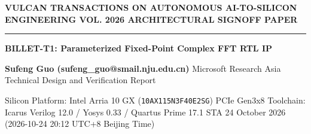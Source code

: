 \documentclass[11pt,a4paper]{article}
\begin{document}
{\scriptsize\sffamily\textcolor{vulcan}{\textbf{VULCAN TRANSACTIONS ON AUTONOMOUS AI-TO-SILICON ENGINEERING \hfill VOL. 2026 \textperiodcentered{} ARCHITECTURAL SIGNOFF PAPER}}\par}

\vspace{1pt}\textcolor{vulcan}{\rule{\textwidth}{1.2pt}}\vspace{4pt}

\begin{center}

{\sffamily\LARGE\bfseries BILLET-T1: Parameterized Fixed-Point Complex FFT RTL IP\par}\vspace{3pt}

{\small\sffamily\textbf{Sufeng Guo (\allowbreak{}sufeng\_\allowbreak{}guo@smail.nju.edu.cn)\allowbreak{}} \textperiodcentered{} Microsoft Research Asia \textperiodcentered{} Technical Design and Verification Report\par}\vspace{1pt}

{\scriptsize\sffamily\textcolor{black!75}{Silicon Platform: Intel Arria 10 GX (\texttt{10AX115N3F40E2SG}) PCIe Gen3x8 \textperiodcentered{} Toolchain: Icarus Verilog 12.0 / Yosys 0.33 / Quartus Prime 17.1 STA \textperiodcentered{} 24 October 2026 (\allowbreak{}2026-10-24 20:12 UTC+\allowbreak{}8 Beijing Time)\allowbreak{}}\par}

\end{center}\vspace{2pt}
\end{document}
